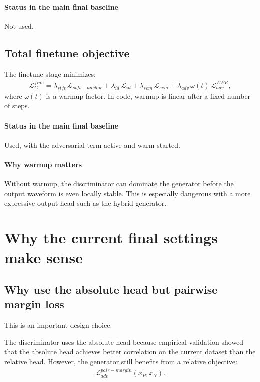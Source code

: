 \documentclass[11pt]{article}
\begin{document}
\paragraph{Status in the main final baseline}
Not used.

\subsection{Total finetune objective}
The finetune stage minimizes:
\begin{align}
    \mathcal{L}_{G}^{fine}
    = \lambda_{stft}\,\mathcal{L}_{stft-anchor}
    + \lambda_{id}\,\mathcal{L}_{id}
    + \lambda_{sem}\,\mathcal{L}_{sem}
    + \lambda_{adv}\,\omega(t)\,\mathcal{L}_{adv}^{WER},
\end{align}
where $\omega(t)$ is a warmup factor. In code, warmup is linear after a fixed number of steps.

\paragraph{Status in the main final baseline}
Used, with the adversarial term active and warm-started.

\paragraph{Why warmup matters}
Without warmup, the discriminator can dominate the generator before the output waveform is even locally stable. This is especially dangerous with a more expressive output head such as the hybrid generator.

\section{Why the current final settings make sense}

\subsection{Why use the absolute head but pairwise margin loss}
This is an important design choice.

The discriminator uses the absolute head because empirical validation showed that the absolute head achieves better correlation on the current dataset than the relative head. However, the generator still benefits from a relative objective:
\begin{align}
    \mathcal{L}_{adv}^{pair-margin}(x_P, x_N).
\end{align}
\end{document}
